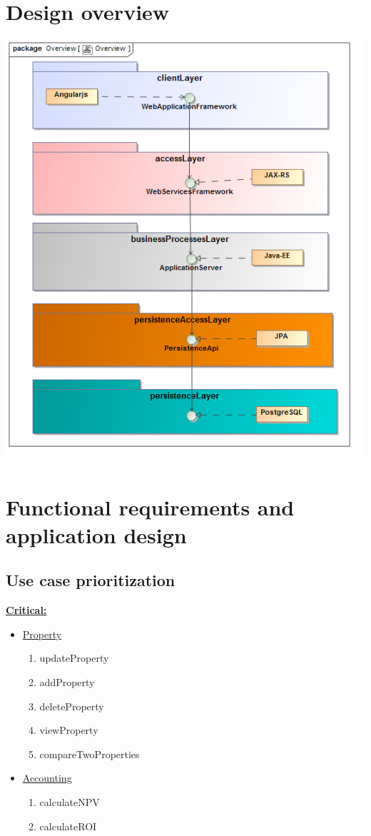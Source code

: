 \documentclass[a4paper,12pt]{article}
\begin{document}
\section{Design overview}
\includegraphics[width=1\textwidth]{./Images/Overview.png}

\newpage
\section{Functional requirements and application design}

\subsection{Use case prioritization}
 \underline{\textbf{Critical:}}
	\begin{itemize}
		\item \underline{Property}
			\begin{enumerate}
				\item updateProperty
				\item addProperty
				\item deleteProperty
				\item viewProperty
				\item compareTwoProperties
			\end{enumerate}
		\item \underline{Accounting}
			\begin{enumerate}
				\item calculateNPV
				\item calculateROI
			\end{enumerate}
	\end{itemize}
\end{document}
